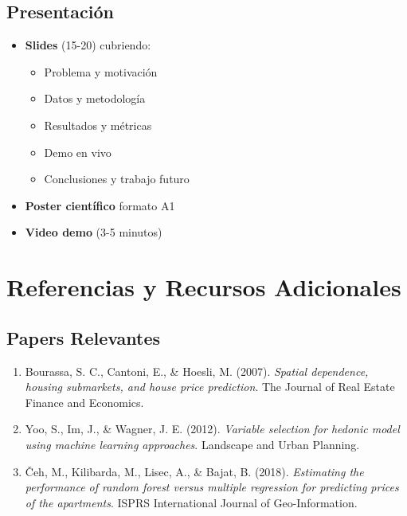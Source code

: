 \documentclass[11pt,a4paper]{article}
\begin{document}
\subsection{Presentación}

\begin{itemize}
    \item \textbf{Slides} (15-20) cubriendo:
    \begin{itemize}
        \item Problema y motivación
        \item Datos y metodología
        \item Resultados y métricas
        \item Demo en vivo
        \item Conclusiones y trabajo futuro
    \end{itemize}
    
    \item \textbf{Poster científico} formato A1
    \item \textbf{Video demo} (3-5 minutos)
\end{itemize}

\newpage

\section{Referencias y Recursos Adicionales}

\subsection{Papers Relevantes}

\begin{enumerate}
    \item Bourassa, S. C., Cantoni, E., \& Hoesli, M. (2007). \textit{Spatial dependence, housing submarkets, and house price prediction}. The Journal of Real Estate Finance and Economics.
    
    \item Yoo, S., Im, J., \& Wagner, J. E. (2012). \textit{Variable selection for hedonic model using machine learning approaches}. Landscape and Urban Planning.
    
    \item Čeh, M., Kilibarda, M., Lisec, A., \& Bajat, B. (2018). \textit{Estimating the performance of random forest versus multiple regression for predicting prices of the apartments}. ISPRS International Journal of Geo-Information.
\end{enumerate}
\end{document}
